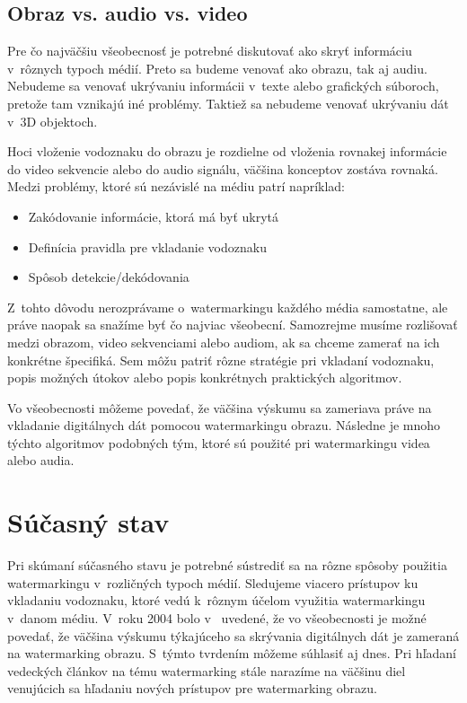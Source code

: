 \section{Obraz vs. audio vs. video}
Pre čo najväčšiu všeobecnosť je potrebné diskutovať ako skryť informáciu v~rôznych typoch médií. Preto sa budeme venovať ako obrazu, tak aj audiu. Nebudeme sa venovať ukrývaniu informácii v~texte alebo grafických súboroch, pretože tam vznikajú iné problémy. Taktiež sa nebudeme venovať ukrývaniu dát v~3D objektoch.

Hoci vloženie vodoznaku do obrazu je rozdielne od vloženia rovnakej informácie do video sekvencie alebo do audio signálu, väčšina konceptov zostáva rovnaká. Medzi problémy, ktoré sú nezávislé na médiu patrí napríklad:

\begin{itemize}
\item Zakódovanie informácie, ktorá má byť ukrytá
\item Definícia pravidla pre vkladanie vodoznaku
\item Spôsob detekcie/dekódovania
\end{itemize}

Z~tohto dôvodu nerozprávame o~watermarkingu každého média samostatne, ale práve naopak sa snažíme byť čo najviac všeobecní. Samozrejme musíme rozlišovať medzi obrazom, video sekvenciami alebo audiom, ak sa chceme zamerať na ich konkrétne špecifiká. Sem môžu patriť rôzne stratégie pri vkladaní vodoznaku, popis možných útokov alebo popis konkrétnych praktických algoritmov.

Vo všeobecnosti môžeme povedať, že väčšina výskumu sa zameriava práve na vkladanie digitálnych dát pomocou watermarkingu obrazu. Následne je mnoho týchto algoritmov podobných tým, ktoré sú použité pri watermarkingu videa alebo audia. \cite{Barni}


\chapter{Súčasný stav}
\label{ch-state}
Pri skúmaní súčasného stavu je potrebné sústrediť sa na rôzne spôsoby použitia watermarkingu v~rozličných typoch médií. Sledujeme viacero prístupov ku vkladaniu vodoznaku, ktoré vedú k~rôznym účelom využitia watermarkingu v~danom médiu. V~roku 2004 bolo v~\cite{Barni} uvedené, že vo všeobecnosti je možné povedať, že väčšina výskumu týkajúceho sa skrývania digitálnych dát je zameraná na watermarking obrazu. S~týmto tvrdením môžeme súhlasiť aj dnes. Pri hľadaní vedeckých článkov na tému watermarking stále narazíme na väčšinu diel venujúcich sa hľadaniu nových prístupov pre watermarking obrazu.

